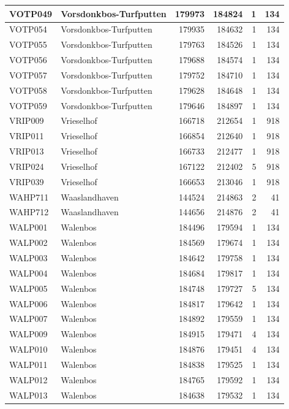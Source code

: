 \documentclass[11pt,]{book}
\begin{document}
\begin{table}
\begin{tabular}[t]{l|l|r|r|r|r}
\hline
VOTP049 & Vorsdonkbos-Turfputten & 179973 & 184824 & 1 & 134\\
\hline
VOTP054 & Vorsdonkbos-Turfputten & 179935 & 184632 & 1 & 134\\
\hline
VOTP055 & Vorsdonkbos-Turfputten & 179763 & 184526 & 1 & 134\\
\hline
VOTP056 & Vorsdonkbos-Turfputten & 179688 & 184574 & 1 & 134\\
\hline
VOTP057 & Vorsdonkbos-Turfputten & 179752 & 184710 & 1 & 134\\
\hline
VOTP058 & Vorsdonkbos-Turfputten & 179628 & 184648 & 1 & 134\\
\hline
VOTP059 & Vorsdonkbos-Turfputten & 179646 & 184897 & 1 & 134\\
\hline
VRIP009 & Vrieselhof & 166718 & 212654 & 1 & 918\\
\hline
VRIP011 & Vrieselhof & 166854 & 212640 & 1 & 918\\
\hline
VRIP013 & Vrieselhof & 166733 & 212477 & 1 & 918\\
\hline
VRIP024 & Vrieselhof & 167122 & 212402 & 5 & 918\\
\hline
VRIP039 & Vrieselhof & 166653 & 213046 & 1 & 918\\
\hline
WAHP711 & Waaslandhaven & 144524 & 214863 & 2 & 41\\
\hline
WAHP712 & Waaslandhaven & 144656 & 214876 & 2 & 41\\
\hline
WALP001 & Walenbos & 184496 & 179594 & 1 & 134\\
\hline
WALP002 & Walenbos & 184569 & 179674 & 1 & 134\\
\hline
WALP003 & Walenbos & 184642 & 179758 & 1 & 134\\
\hline
WALP004 & Walenbos & 184684 & 179817 & 1 & 134\\
\hline
WALP005 & Walenbos & 184748 & 179727 & 5 & 134\\
\hline
WALP006 & Walenbos & 184817 & 179642 & 1 & 134\\
\hline
WALP007 & Walenbos & 184892 & 179559 & 1 & 134\\
\hline
WALP009 & Walenbos & 184915 & 179471 & 4 & 134\\
\hline
WALP010 & Walenbos & 184876 & 179451 & 4 & 134\\
\hline
WALP011 & Walenbos & 184838 & 179525 & 1 & 134\\
\hline
WALP012 & Walenbos & 184765 & 179592 & 1 & 134\\
\hline
WALP013 & Walenbos & 184638 & 179532 & 1 & 134\\

\end{tabular}
\end{table}
\end{document}
